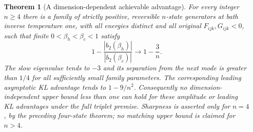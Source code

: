 \documentclass[11pt]{article}
\newtheorem{theorem}{Theorem}
\begin{document}
\begin{theorem}[A dimension-dependent achievable advantage]
\label{thm:highdimamplitude}
For every integer $n\geq4$ there is a family of strictly positive,
reversible $n$-state generators at bath inverse temperature one, with
all energies distinct and all original $F_{ijk},G_{ijk}<0$, such that
finite $0<\beta_h<\beta_c<1$ satisfy
\[
1-\frac{|b_2(\beta_h)|}{|b_2(\beta_c)|}
\longrightarrow 1-\frac3n.
\]
The slow eigenvalue tends to $-3$ and its separation from the next mode
is greater than $1/4$ for all sufficiently small family parameters.
The corresponding leading asymptotic KL advantage tends to $1-9/n^2$.
Consequently no dimension-independent upper bound less than one can
hold for these amplitude or leading KL advantages under the full
triplet premise. Sharpness is asserted only for $n=4$, by the preceding
four-state theorem; no matching upper bound is claimed for $n>4$.
\end{theorem}
\end{document}
